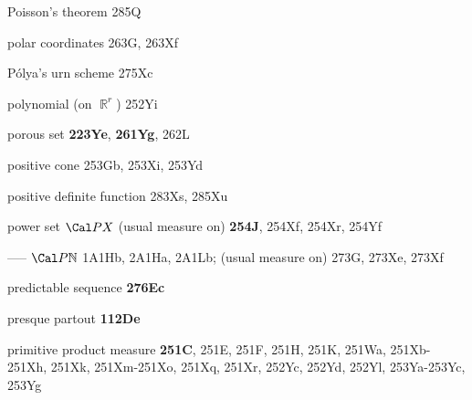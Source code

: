 Poisson's theorem 285Q




polar coordinates 263G, 263Xf









P\'olya's urn scheme 275Xc


polynomial (on $\BbbR^r$) 252Yi








porous set {\bf 223Ye}, {\bf 261Yg}, 262L


positive cone 253Gb, 253Xi, 253Yd


positive definite function 283Xs, 285Xu













power set $\Cal PX$
  (usual measure on) {\bf 254J}, 254Xf, 254Xr, 254Yf




{----- $\Cal P\Bbb N$ }
1A1Hb,
  2A1Ha, 2A1Lb;  
  (usual measure on)  273G, 273Xe, 273Xf
  



















predictable sequence {\bf 276Ec}







presque partout {\bf 112De}




primitive product measure {\bf 251C}, 251E, 251F, 251H, 251K, 251Wa,
251Xb-251Xh, 
251Xk, 251Xm-251Xo, 
251Xq, 251Xr, 252Yc, 252Yd, 252Yl, 253Ya-253Yc, 
253Yg








